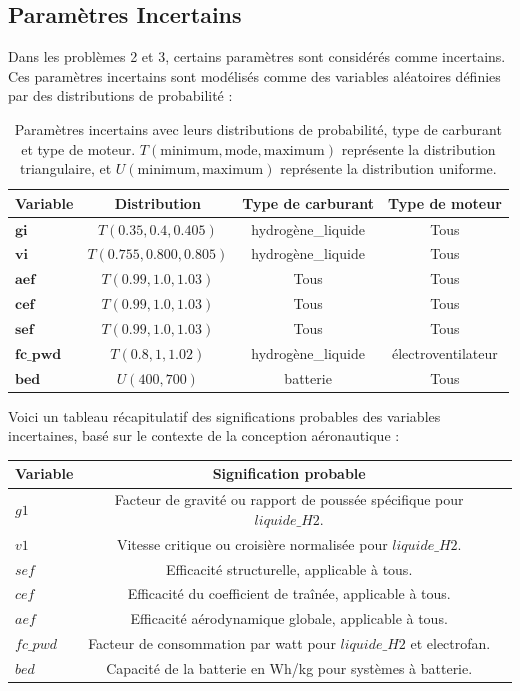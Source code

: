 \documentclass[a4paper, 11pt]{article}
\begin{document}
\subsection{Paramètres Incertains}
Dans les problèmes 2 et 3, certains paramètres sont considérés comme incertains. Ces paramètres incertains sont modélisés comme des variables aléatoires définies par des distributions de probabilité :

\begin{table}[H]
\centering
\begin{tabular}{l c c c}
\toprule
\textbf{Variable} & \textbf{Distribution} & \textbf{Type de carburant} & \textbf{Type de moteur} \\ 
\midrule
\( \textbf{gi} \) & \( T(0.35, 0.4, 0.405) \) & hydrogène\_liquide & Tous \\
\( \textbf{vi} \) & \( T(0.755, 0.800, 0.805) \) & hydrogène\_liquide & Tous \\
\( \textbf{aef} \) & \( T(0.99, 1.0, 1.03) \) & Tous & Tous \\
\( \textbf{cef} \) & \( T(0.99, 1.0, 1.03) \) & Tous & Tous \\
\( \textbf{sef} \) & \( T(0.99, 1.0, 1.03) \) & Tous & Tous \\
\( \textbf{fc\_pwd} \) & \( T(0.8, 1, 1.02) \) & hydrogène\_liquide & électroventilateur \\
\( \textbf{bed} \) & \( U(400, 700) \) & batterie & Tous \\
\bottomrule
\end{tabular}
\caption{Paramètres incertains avec leurs distributions de probabilité, type de carburant et type de moteur. \( T(\text{minimum}, \text{mode}, \text{maximum}) \) représente la distribution triangulaire, et \( U(\text{minimum}, \text{maximum}) \) représente la distribution uniforme.}
\end{table}

Voici un tableau récapitulatif des significations probables des variables incertaines, basé sur le contexte de la conception aéronautique :


\begin{center}
\begin{tabular}{lcp{8cm}}
\toprule
Variable & Signification probable \\
\midrule
\( g1 \) & Facteur de gravité ou rapport de poussée spécifique pour \( liquide\_H2 \). \\
\( v1 \) & Vitesse critique ou croisière normalisée pour \( liquide\_H2 \). \\
\( sef \) & Efficacité structurelle, applicable à tous. \\
\( cef \) & Efficacité du coefficient de traînée, applicable à tous. \\
\( aef \) & Efficacité aérodynamique globale, applicable à tous. \\
\( fc\_pwd \) & Facteur de consommation par watt pour \( liquide\_H2 \) et electrofan. \\
\( bed \) & Capacité de la batterie en Wh/kg pour systèmes à batterie. \\
\bottomrule
\end{tabular}
\end{center}
\end{document}
